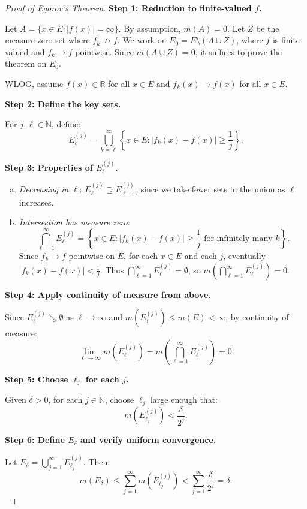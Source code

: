 \documentclass[11pt]{report}
\begin{document}
\begin{proof}[Proof of Egorov's Theorem]
\textbf{Step 1: Reduction to finite-valued $f$.}

Let $A = \{x \in E : |f(x)| = \infty\}$. By assumption, $m(A) = 0$. Let $Z$ be the measure zero set where $f_k \not\to f$. We work on $E_0 = E \setminus (A \cup Z)$, where $f$ is finite-valued and $f_k \to f$ pointwise. Since $m(A \cup Z) = 0$, it suffices to prove the theorem on $E_0$.

WLOG, assume $f(x) \in \mathbb{R}$ for all $x \in E$ and $f_k(x) \to f(x)$ for all $x \in E$.

\textbf{Step 2: Define the key sets.}

For $j, \ell \in \mathbb{N}$, define:
\[
E_\ell^{(j)} = \bigcup_{k=\ell}^{\infty} \left\{ x \in E : |f_k(x) - f(x)| \geq \frac{1}{j} \right\}.
\]

\textbf{Step 3: Properties of $E_\ell^{(j)}$.}

\begin{enumerate}[(a)]
    \item \textit{Decreasing in $\ell$}: $E_\ell^{(j)} \supseteq E_{\ell+1}^{(j)}$ since we take fewer sets in the union as $\ell$ increases.
    
    \item \textit{Intersection has measure zero}: 
    \[
    \bigcap_{\ell=1}^{\infty} E_\ell^{(j)} = \left\{ x \in E : |f_k(x) - f(x)| \geq \frac{1}{j} \text{ for infinitely many } k \right\}.
    \]
    Since $f_k \to f$ pointwise on $E$, for each $x \in E$ and each $j$, eventually $|f_k(x) - f(x)| < \frac{1}{j}$. Thus $\bigcap_{\ell=1}^{\infty} E_\ell^{(j)} = \emptyset$, so $m\left(\bigcap_{\ell=1}^{\infty} E_\ell^{(j)}\right) = 0$.
\end{enumerate}

\textbf{Step 4: Apply continuity of measure from above.}

Since $E_\ell^{(j)} \searrow \emptyset$ as $\ell \to \infty$ and $m(E_1^{(j)}) \leq m(E) < \infty$, by continuity of measure:
\[
\lim_{\ell \to \infty} m(E_\ell^{(j)}) = m\left(\bigcap_{\ell=1}^{\infty} E_\ell^{(j)}\right) = 0.
\]

\textbf{Step 5: Choose $\ell_j$ for each $j$.}

Given $\delta > 0$, for each $j \in \mathbb{N}$, choose $\ell_j$ large enough that:
\[
m(E_{\ell_j}^{(j)}) < \frac{\delta}{2^j}.
\]

\textbf{Step 6: Define $E_\delta$ and verify uniform convergence.}

Let $E_\delta = \bigcup_{j=1}^{\infty} E_{\ell_j}^{(j)}$. Then:
\[
m(E_\delta) \leq \sum_{j=1}^{\infty} m(E_{\ell_j}^{(j)}) < \sum_{j=1}^{\infty} \frac{\delta}{2^j} = \delta.
\]


\end{proof}
\end{document}
